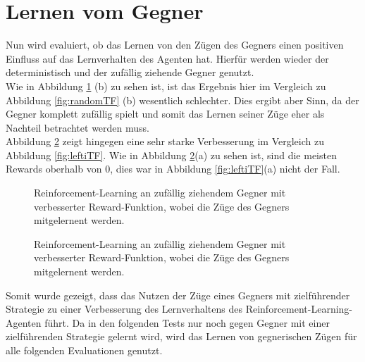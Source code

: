\section{Lernen vom Gegner}
Nun wird evaluiert, ob das Lernen von den Zügen des Gegners einen positiven Einfluss auf das Lernverhalten des Agenten hat. Hierfür werden wieder der deterministisch und der zufällig ziehende Gegner genutzt.\\
Wie in Abbildung \ref{fig:randomTT} (b) zu sehen ist, ist das Ergebnis hier im Vergleich zu Abbildung \ref{fig:randomTF} (b) wesentlich schlechter. Dies ergibt aber Sinn, da der Gegner komplett zufällig spielt und somit das Lernen seiner Züge eher als Nachteil betrachtet werden muss.\\
Abbildung \ref{fig:leftiTT} zeigt hingegen eine sehr starke Verbesserung im Vergleich zu Abbildung \ref{fig:leftiTF}. Wie in Abbildung \ref{fig:leftiTT}(a) zu sehen ist, sind die meisten Rewards oberhalb von 0, dies war in Abbildung \ref{fig:leftiTF}(a) nicht der Fall.\\


\begin{figure}%
    \centering
    \qquad
    \caption{Reinforcement-Learning an zufällig ziehendem Gegner mit verbesserter Reward-Funktion, wobei die Züge des Gegners mitgelernent werden.}%
    \label{fig:randomTT}%
\end{figure}

\begin{figure}%
    \centering
    \qquad
    \caption{Reinforcement-Learning an zufällig ziehendem Gegner mit verbesserter Reward-Funktion, wobei die Züge des Gegners mitgelernent werden.}%
    \label{fig:leftiTT}%
\end{figure}

Somit wurde gezeigt, dass das Nutzen der Züge eines Gegners mit zielführender Strategie zu einer Verbesserung des Lernverhaltens des Reinforcement-Learning-Agenten führt.
Da in den folgenden Tests nur noch gegen Gegner mit einer zielführenden Strategie gelernt wird, wird das Lernen von gegnerischen Zügen für alle folgenden Evaluationen genutzt.

